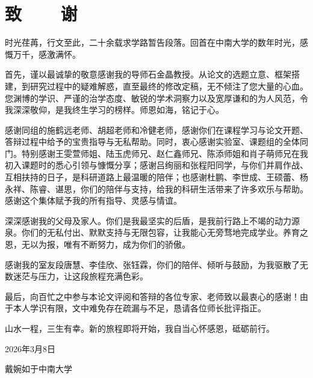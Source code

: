 \newpage
\section{{致~~~~谢}} %
\renewcommand*{\baselinestretch}{1.0} %
\setlength{\baselineskip}{20pt} %
{
	
	时光荏苒，行文至此，二十余载求学路暂告段落。回首在中南大学的数年时光，感慨万千，感激满怀。
	
	首先，谨以最诚挚的敬意感谢我的导师石金晶教授。从论文的选题立意、框架搭建，到研究过程中的疑难解惑，直至最终的修改定稿，无不倾注了您大量的心血。您渊博的学识、严谨的治学态度、敏锐的学术洞察力以及宽厚谦和的为人风范，令我深深敬仰，是我终生学习的榜样。师恩如海，铭记于心。
	
	感谢同组的施鹤远老师、胡超老师和冷健老师，感谢你们在课程学习与论文开题、答辩过程中给予的宝贵指导与无私帮助。同时，衷心感谢实验室、课题组的全体同门。特别感谢王雯萱师姐、陆玉虎师兄、赵仁鑫师兄、陈添师姐和肖子萌师兄在我初入课题时的悉心引领与慷慨分享；感谢吕绚丽和张程阳同学，与你们并肩作战、互相扶持的日子，是科研道路上最温暖的陪伴；也感谢杜鹏、李世成、王硕蕾、杨永祥、陈睿、谌思，你们的陪伴与支持，给我的科研生活带来了许多欢乐与帮助。感谢这个集体赋予我的所有指导、灵感与情谊。
	
	深深感谢我的父母及家人。你们是我最坚实的后盾，是我前行路上不竭的动力源泉。你们的无私付出、默默支持与无限包容，让我能心无旁骛地完成学业。养育之恩，无以为报，唯有不断努力，成为你们的骄傲。
	
	感谢我的室友段唐慧、李佳欣、张钰霖，你们的陪伴、倾听与鼓励，为我驱散了无数迷茫与压力，让这段旅程充满色彩。
	
	最后，向百忙之中参与本论文评阅和答辩的各位专家、老师致以最衷心的感谢！由于本人学识有限，文中难免存在疏漏与不足，恳请各位师长批评指正。
	
	山水一程，三生有幸。新的旅程即将开始，我自当心怀感恩，砥砺前行。
}
\vspace{-9pt}
\vspace{1.5cm}

\hfill 2026年3月8日

\hfill 戴婉如于中南大学

\fi